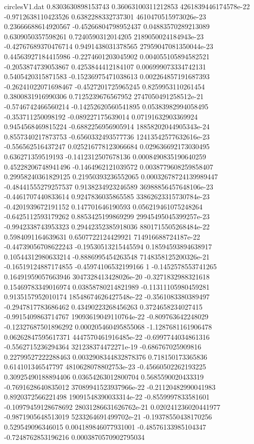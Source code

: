 \begin{filecontents}{circlesV1.dat}
0.8303630898153743	0.36063100311212853	4261839446174578e-22
-0.9712638110423526	0.6382288332737301	4610470515973026e-23
0.23666688614920567	-0.45266804798952437	0.04883570289213089
0.6309050357598261	0.7240590312014205	2189050024184943e-23
-0.42767689370476714	0.9491438031378565	27959047081350044e-23
0.44563927184415986	-0.2274601203045902	0.004055105894582521
-0.2053874739053867	0.4253844412184107	0.006999073334742131
0.5405420315871583	-0.15236975471038613	0.002264857191687393
-0.26241022071698467	-0.4527201725965245	0.8259953110261454
0.3800831916990306	0.7125239676567952	2747050491258512e-21
-0.5746742466560214	-0.14252620560541895	0.05383982994058495
-0.353711250098192	-0.089227175639014	0.07191632903369924
0.9454568469815224	-0.6882256956905914	18858202044905343e-24
0.8557340217873753	-0.6560332493577736	12413542577632616e-23
-0.556562516437247	0.025216778123066684	0.029636692173030495
0.636271359519193	-0.1412312507678136	0.0008490835190640259
0.45228206748941496	-0.1464962121039572	0.0038779608259858407
0.29958240361829125	0.21950393236552065	0.00032678724139989447
-0.48441555279257537	0.9138234923246589	36988856457648106e-23
-0.4461707440833614	0.9247836035865585	33862623315730784e-23
-0.4201939672191152	0.147701646190593	0.056219461075248264
-0.6425112593179262	0.8853425199869299	29945495045399257e-23
-0.9942338743953323	0.29442352385918036	8801715505268484e-22
0.5984091164639631	0.6507722124429921	714916688724187e-22
-0.44739056708622243	-0.19530513215445594	0.18594593894638917
0.10544312980633214	-0.8886995454263548	7148358125200326e-21
-0.16519124887174855	-0.45974106532199166	1
-0.1452578553741265	0.16491959057663946	3047328413428026e-20
-0.3271832988321618	0.15469783349016974	0.03858780214821989
-0.11311105980459281	0.9135157952010174	18548674626427548e-22
-0.3561083380389497	-0.2947817783686462	0.43490223268456263
0.3724658234027415	-0.9915409863714767	19093619049110764e-22
-0.809763642248029	-0.12327687501896292	0.000205460495855068
-1.1287681161906478	0.06262847595617371	4447570461916485e-22
-0.6997744034861316	-0.5562715236294364	321238374472271e-19
-0.686767025909816	0.22799527222288463	0.0032908344832878376
0.718150173365836	0.614101346547797	4810628078802753e-23
-0.45660502262193225	0.30925490188894406	0.03654263012800704
0.5685590020433319	-0.7691628640835012	37089941523937966e-22
-0.21120482990041983	0.8920372566221498	19091548390033314e-22
-0.8559997833581601	-0.10979459128678692	28031286631626762e-21
0.020241236020441977	-0.9871905648513019	5233264691499702e-21
-0.19378550438170256	0.529549096346015	0.004189846077931001
-0.48576133985104347	-0.7248762853196216	0.0003870570902795034

\end{filecontents}
